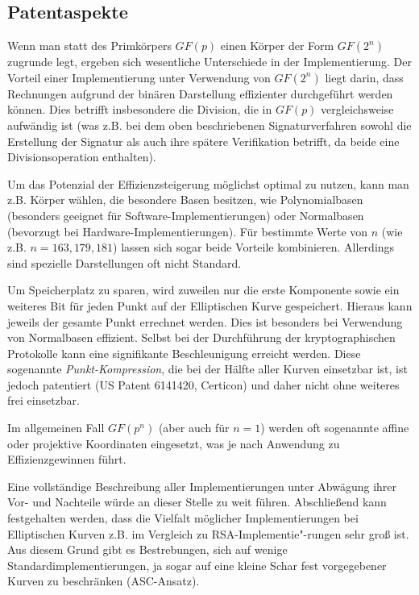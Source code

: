 \begin{refsegment}
\section{Patentaspekte}

Wenn man statt des Primkörpers $GF(p)$ einen Körper der Form $GF(2^n)$ zugrunde legt, ergeben sich wesentliche Unterschiede in der Implementierung. Der Vorteil einer Implementierung unter Verwendung von $GF(2^n)$ liegt darin, dass Rechnungen aufgrund der binären Darstellung effizienter durchgeführt werden können. Dies betrifft insbesondere die Division, die in $GF(p)$ vergleichsweise aufwändig ist (was z.B. bei dem oben beschriebenen Signaturverfahren sowohl die Erstellung der Signatur als auch ihre spätere Verifikation betrifft, da beide eine Divisionsoperation enthalten).

Um das Potenzial der Effizienzsteigerung möglichst optimal zu nutzen, kann man z.B. Körper wählen, die besondere Basen besitzen, wie Polynomialbasen (besonders geeignet für Software-Implementierungen) oder Normalbasen (bevorzugt bei Hardware-Implementierungen). Für bestimmte Werte von $n$ (wie z.B. $n=163,179,181$) lassen sich sogar beide Vorteile kombinieren. Allerdings sind spezielle Darstellungen oft nicht Standard.

Um Speicherplatz zu sparen, wird zuweilen nur die erste Komponente sowie ein weiteres Bit für jeden Punkt auf der Elliptischen Kurve gespeichert. Hieraus kann jeweils der gesamte Punkt errechnet werden. Dies ist besonders bei Verwendung von Normalbasen effizient. Selbst bei der Durchführung der kryptographischen Protokolle kann eine signifikante Beschleunigung erreicht werden. Diese sogenannte {\it Punkt-Kompression}, die bei der Hälfte aller Kurven einsetzbar ist, ist jedoch patentiert (US Patent 6141420, Certicon) und daher nicht ohne weiteres frei einsetzbar.

Im allgemeinen Fall $GF(p^n)$ (aber auch für $n=1$) werden oft sogenannte affine oder projektive Koordinaten eingesetzt, was je nach Anwendung zu Effizienzgewinnen führt.

Eine vollständige Beschreibung aller Implementierungen unter Abwägung ihrer Vor- und Nachteile würde an dieser Stelle zu weit führen. Abschließend kann festgehalten werden, dass die Vielfalt möglicher Implementierungen bei Elliptischen Kurven z.B. im Vergleich zu RSA-Implementie"-rungen sehr groß ist. Aus diesem Grund gibt es Bestrebungen, sich auf wenige Standardimplementierungen, ja sogar auf eine kleine Schar fest vorgegebener Kurven zu beschränken (ASC-Ansatz).


\end{refsegment}
